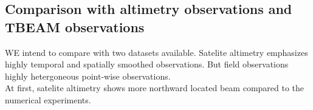 \documentclass[12pt]{article}
\begin{document}
\subsection{Comparison with altimetry observations and TBEAM observations}
WE intend to compare with two datasets available. Satelite altimetry emphasizes highly temporal and 
spatially smoothed observations. But field observations highly hetergoneous point-wise 
observations.\\
At first, satelite altimetry shows more northward located beam compared to the numerical 
experiments. 
%
%
%
\end{document}
